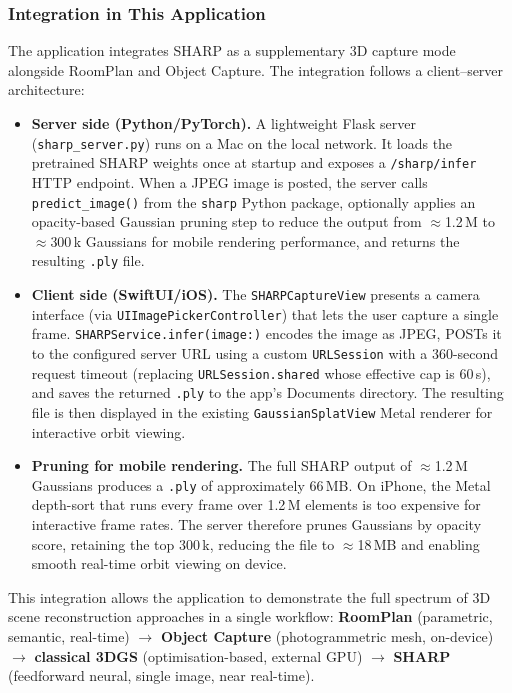 \subsubsection{Integration in This Application}
\label{subsubsec:sharp_integration}

The application integrates SHARP as a supplementary 3D capture mode alongside RoomPlan and Object Capture. The integration follows a client--server architecture:

\begin{itemize}
    \item \textbf{Server side (Python/PyTorch).} A lightweight Flask server (\texttt{sharp\_server.py}) runs on a Mac on the local network. It loads the pretrained SHARP weights once at startup and exposes a \texttt{/sharp/infer} HTTP endpoint. When a JPEG image is posted, the server calls \texttt{predict\_image()} from the \texttt{sharp} Python package, optionally applies an opacity-based Gaussian pruning step to reduce the output from $\approx$1.2\,M to $\approx$300\,k Gaussians for mobile rendering performance, and returns the resulting \texttt{.ply} file.

    \item \textbf{Client side (SwiftUI/iOS).} The \texttt{SHARPCaptureView} presents a camera interface (via \texttt{UIImagePickerController}) that lets the user capture a single frame. \texttt{SHARPService.infer(image:)} encodes the image as JPEG, POSTs it to the configured server URL using a custom \texttt{URLSession} with a 360-second request timeout (replacing \texttt{URLSession.shared} whose effective cap is 60\,s), and saves the returned \texttt{.ply} to the app's Documents directory. The resulting file is then displayed in the existing \texttt{GaussianSplatView} Metal renderer for interactive orbit viewing.

    \item \textbf{Pruning for mobile rendering.} The full SHARP output of $\approx$1.2\,M Gaussians produces a \texttt{.ply} of approximately 66\,MB. On iPhone, the Metal depth-sort that runs every frame over 1.2\,M elements is too expensive for interactive frame rates. The server therefore prunes Gaussians by opacity score, retaining the top 300\,k, reducing the file to $\approx$18\,MB and enabling smooth real-time orbit viewing on device.
\end{itemize}

This integration allows the application to demonstrate the full spectrum of 3D scene reconstruction approaches in a single workflow: \textbf{RoomPlan} (parametric, semantic, real-time) $\rightarrow$ \textbf{Object Capture} (photogrammetric mesh, on-device) $\rightarrow$ \textbf{classical 3DGS} (optimisation-based, external GPU) $\rightarrow$ \textbf{SHARP} (feedforward neural, single image, near real-time).

